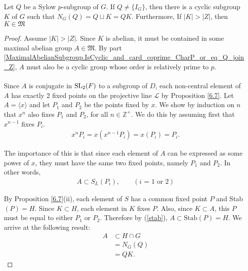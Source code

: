 \begin{footnotesize}
\begin{theorem}
  \label{MaximalAbelianSubgroup.K_mem_MaximalAbelianSubgroups_of_center_lt_card_K}
  Let $Q$ be a Sylow $p$-subgroup of $G$. If $Q \neq \{I_G\}$, then there is a cyclic subgroup $K$ of $G$ such that $N_G(Q) = Q \sqcup K = QK$. Furthermore, If $|K| > |Z|$, then $K \in \mathfrak{M}$
\end{theorem}
\begin{proof} 
Assume $|K| > |Z|$. Since $K$ is abelian, it must be contained in some maximal abelian group $A \in \mathfrak{M}$. By part \ref{MaximalAbelianSubgroup.IsCyclic_and_card_coprime_CharP_or_eq_Q_join_Z}, $A$ must also be a cyclic group whose order is relatively prime to $p$. \\
\\
Since $A$ is conjugate in $\operatorname{SL}_2(F)$ to a subgroup of $D$, each non-central element of $A$ has exactly 2 fixed points on the projective line $\mathscr{L}$ by Proposition \ref{6.7}. Let $A = \langle x \rangle$ and let $P_1$ and $P_2$ be the points fixed by $x$. We show by induction on $n$ that $x^n$ also fixes $P_1$ and $P_2$, for all $n \in \mathbb{Z^+}$. We do this by assuming first that $x^{n-1}$ fixes $P_i$.
\begin{align*} x^n P_i = x(x^{n-1} P_i) = x (P_i) = P_i.
\end{align*}

The importance of this is that since each element of $A$ can be expressed as some power of $x$, they must have the same two fixed points, namely $P_1$ and $P_2$. In other words, 
\begin{align}\label{stab} A \subset S_L(P_i), \qquad (\text{$i$ = 1 or 2})
\end{align}

By Proposition \ref{6.7}(ii), each element of $S$ has a common fixed point $P$ and Stab$(P) = H$. Since $K \subset H$, each element in $K$ fixes $P$. Also, since $K \subset A$, this $P$ must be equal to either $P_1$ or $P_2$. Therefore by (\ref{stab}), $A \subset \text{Stab}(P) = H$. We arrive at the following result:
\begin{align*} A &\subset H \cap G 
\\ &= N_G(Q) %
\\ &= QK. %
\end{align*}


\end{proof}
\end{footnotesize}
